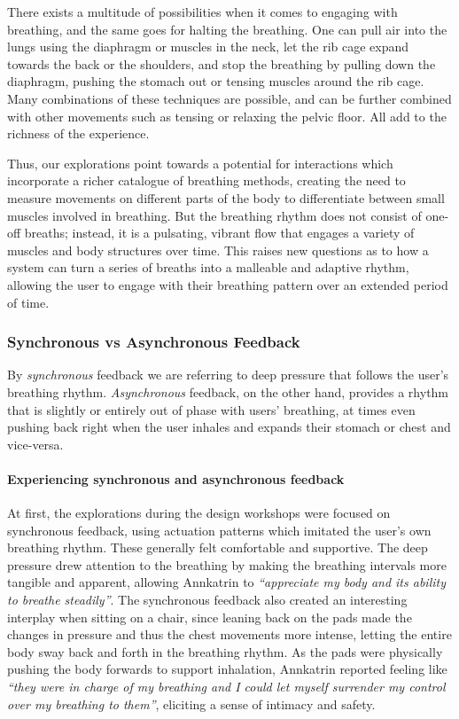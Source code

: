 There exists a multitude of possibilities when it comes to engaging with breathing, and the same goes for halting the breathing. One can pull air into the lungs using the diaphragm or muscles in the neck, let the rib cage expand towards the back or the shoulders, and stop the breathing by pulling down the diaphragm, pushing the stomach out or tensing muscles around the rib cage. Many combinations of these techniques are possible, and can be further combined with other movements such as tensing or relaxing the pelvic floor. All add to the richness of the experience.

Thus, our explorations point towards a potential for interactions which incorporate a richer catalogue of breathing methods, creating the need to measure movements on different parts of the body to differentiate between small muscles involved in breathing. But the breathing rhythm does not consist of one-off breaths; instead, it is a pulsating, vibrant flow that engages a variety of muscles and body structures over time. This raises new questions as to how a system can turn a series of breaths into a malleable and adaptive rhythm, allowing the user to engage with their breathing pattern over an extended period of time.


\subsubsection{Synchronous vs Asynchronous Feedback}

By \textit{synchronous} feedback we are referring to deep pressure that follows the user's breathing rhythm. \textit{Asynchronous} feedback, on the other hand, provides a rhythm that is slightly or entirely out of phase with users' breathing, at times even pushing back right when the user inhales and expands their stomach or chest and vice-versa.

\paragraph{Experiencing synchronous and asynchronous feedback}

At first, the explorations during the design workshops were focused on synchronous feedback, using actuation patterns which imitated the user's own breathing rhythm. These generally felt comfortable and supportive. The deep pressure drew attention to the breathing by making the breathing intervals more tangible and apparent, allowing Annkatrin to \textit{``appreciate my body and its ability to breathe steadily''}. The synchronous feedback also created an interesting interplay when sitting on a chair, since leaning back on the pads made the changes in pressure and thus the chest movements more intense, letting the entire body sway back and forth in the breathing rhythm. As the pads were physically pushing the body forwards to support inhalation, Annkatrin reported feeling like \textit{``they were in charge of my breathing and I could let myself surrender my control over my breathing to them''}, eliciting a sense of intimacy and safety.


